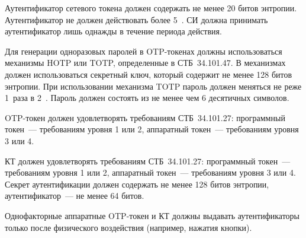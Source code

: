 Аутентификатор сетевого токена должен содержать не менее 20 битов энтропии. 
%
Аутентификатор не должен действовать более 5~. 
%
СИ должна принимать аутентификатор лишь однажды в течение периода действия.



\begin{note*}
\end{note*}


Для генерации одноразовых паролей в OTP-токенах должны использоваться 
механизмы HOTP или TOTP, определенные в СТБ~34.101.47. 
%
В механизмах должен использоваться секретный ключ, который содержит не менее
128 битов энтропии.
%
При использовании механизма TOTP пароль должен меняться не реже 1~раза в 
2~.
%
Пароль должен состоять из не менее чем 6 десятичных символов.


OTP-токен должен удовлетворять требованиям СТБ~34.101.27:
программный токен~--- требованиям уровня 1 или 2,
аппаратный токен~--- требованиям уровня 3 или 4.



КТ должен удовлетворять требованиям СТБ~34.101.27:
программный токен~--- требованиям уровня 1 или 2,
аппаратный токен~--- требованиям уровня 3 или 4.
%
Секрет аутентификации должен содержать не менее 128 битов энтропии,
аутентификатор~--- не менее 64 битов.


Однофакторные аппаратные OTP-токен и КТ должны выдавать аутентификаторы 
только после физического воздействия (например, нажатия кнопки).

